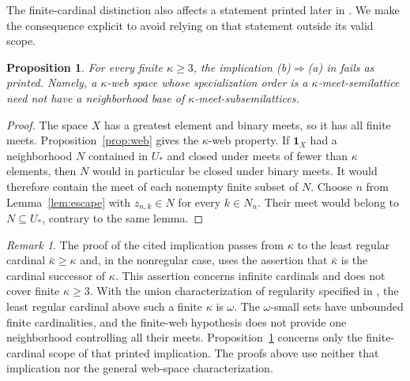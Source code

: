 \documentclass[11pt]{amsart}
\newtheorem{proposition}[theorem]{Proposition}
\theoremstyle{definition}
\theoremstyle{remark}
\newtheorem{remark}[theorem]{Remark}
\numberwithin{equation}{section}
\newcommand{\tops}{\mathbf 1_X}
\begin{document}
The finite-cardinal distinction also affects a statement printed
later in \cite{Erne2009}. We make the consequence explicit to avoid
relying on that statement outside its valid scope.

\begin{proposition}\label{prop:scope}
For every finite $\kappa\geq3$, the implication
\textup{(b)}$\Rightarrow$\textup{(a)} in
\cite[Proposition~6, p.~2066]{Erne2009} fails as printed.
Namely, a $\kappa$-web space whose specialization order is a
$\kappa$-meet-semilattice need not have a neighborhood base of
$\kappa$-meet-subsemilattices.
\end{proposition}

\begin{proof}
The space $X$ has a greatest element and binary meets, so it has
all finite meets. Proposition~\ref{prop:web} gives the
$\kappa$-web property. If $\tops$ had a neighborhood $N$ contained
in $U_*$ and closed under meets of fewer than $\kappa$ elements,
then $N$ would in particular be closed under binary meets.
It would therefore contain the meet of each nonempty finite
subset of $N$. Choose $n$ from Lemma~\ref{lem:escape} with
$z_{n,k}\in N$ for every $k\in N_n$. Their meet would belong to
$N\subseteq U_*$, contrary to the same lemma.
\end{proof}

\begin{remark}\label{rem:regular}
The proof of the cited implication passes from $\kappa$ to the
least regular cardinal $\bar\kappa\geq\kappa$ and, in the
nonregular case, uses the assertion that $\bar\kappa$ is the
cardinal successor of $\kappa$. This assertion concerns infinite
cardinals and does not cover finite $\kappa\geq3$.
With the union characterization of regularity specified in
\cite[Theorem~6]{Erne2009}, the least regular cardinal above such
a finite $\kappa$ is $\omega$. The $\omega$-small sets have
unbounded finite cardinalities, and the finite-web hypothesis
does not provide one neighborhood controlling all their meets.
Proposition~\ref{prop:scope} concerns only the finite-cardinal
scope of that printed implication. The proofs above use neither
that implication nor the general web-space characterization.
\end{remark}
\end{document}
